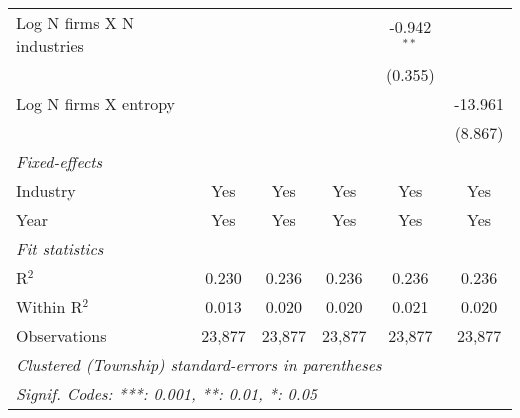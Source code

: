 \begin{tabular}{lccccc}
   Log N firms X N industries           &                 &                 &                 & -0.942$^{**}$   &   \\   
                                        &                 &                 &                 & (0.355)         &   \\   
   Log N firms X entropy                &                 &                 &                 &                 & -13.961\\   
                                        &                 &                 &                 &                 & (8.867)\\   
   \midrule
   \emph{Fixed-effects}\\
   Industry                             & Yes             & Yes             & Yes             & Yes             & Yes\\  
   Year                                 & Yes             & Yes             & Yes             & Yes             & Yes\\  
   \midrule
   \emph{Fit statistics}\\
   R$^2$                                & 0.230           & 0.236           & 0.236           & 0.236           & 0.236\\  
   Within R$^2$                         & 0.013           & 0.020           & 0.020           & 0.021           & 0.020\\  
   Observations                         & 23,877          & 23,877          & 23,877          & 23,877          & 23,877\\  
   \midrule \midrule
   \multicolumn{6}{l}{\emph{Clustered (Township) standard-errors in parentheses}}\\
   \multicolumn{6}{l}{\emph{Signif. Codes: ***: 0.001, **: 0.01, *: 0.05}}\\
\end{tabular}
\par\endgroup
